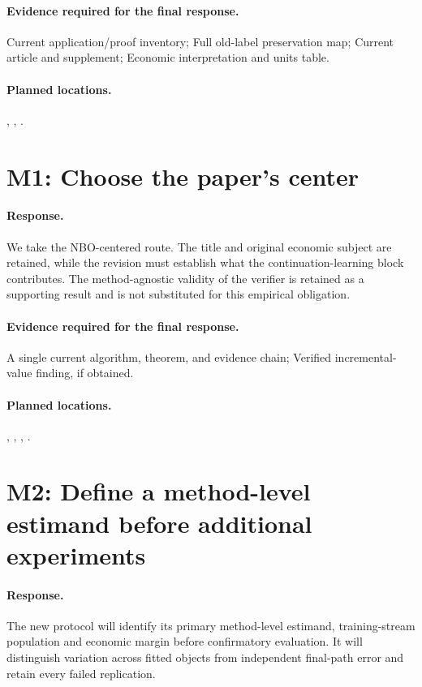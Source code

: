 \paragraph*{Evidence required for the final response.} Current application/proof inventory; Full old-label preservation map; Current article and supplement; Economic interpretation and units table.
\paragraph*{Planned locations.} , , .

\section*{M1: Choose the paper's center}
\paragraph*{Response.} We take the NBO-centered route. The title and original economic subject are retained, while the revision must establish what the continuation-learning block contributes. The method-agnostic validity of the verifier is retained as a supporting result and is not substituted for this empirical obligation.
\paragraph*{Evidence required for the final response.} A single current algorithm, theorem, and evidence chain; Verified incremental-value finding, if obtained.
\paragraph*{Planned locations.} , , , .

\section*{M2: Define a method-level estimand before additional experiments}
\paragraph*{Response.} The new protocol will identify its primary method-level estimand, training-stream population and economic margin before confirmatory evaluation. It will distinguish variation across fitted objects from independent final-path error and retain every failed replication.
